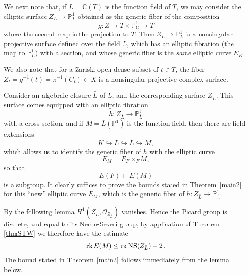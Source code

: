 \documentclass[11pt]{amsart}
\theoremstyle{definition}
\theoremstyle{definition}
\theoremstyle{remark}
\theoremstyle{remark}
\theoremstyle{definition}
\theoremstyle{conjecture}
\newcommand{\NS}{\mathrm{NS}}
\begin{document}
We next note that, if $L={\mathbb C}(T)$ is the function field of $T$,
we may consider the elliptic surface $Z_L\to {\mathbb P}^1_L$
obtained as the generic fiber of the composition
\[
g:Z\to T\times{\mathbb P}^1_{\mathbb C} \to T
\]
where the second map is the projection to $T$.
Then $Z_L\to {\mathbb P}^1_L$ is a nonsingular projective surface
defined over the field $L$, which has an elliptic fibration
(the map to ${\mathbb P}^1_L$) with a section,
and whose generic fiber is the {\em same} elliptic curve $E_K$.

We also note that for a Zariski open dense subset of $t\in T$,
the fiber $Z_t=g^{-1}(t)=\pi^{-1}(C_t)\subset X$ is a nonsingular projective complex surface.

Consider an algebraic closure $\bar{L}$ of $L$, and the corresponding surface $Z_{\bar{L}}$.  This surface comes equipped with an elliptic fibration
\[
h:Z_{\bar{L}}\to {\mathbb P}^1_{\bar{L}}
\]
with a cross section, and if $M=\bar{L}({\mathbb P}^1)$ is the function field,
then there are field extensions
\[
K\hookrightarrow L \hookrightarrow \bar{L}\hookrightarrow M,
\]
which allows us to identify the generic fiber of $h$ with the elliptic curve
\[
E_M=E_F\times_FM,
\]
so that
\[
E(F)\subset E(M)
\]
is a subgroup.
It clearly suffices to prove the bounds stated in Theorem~\ref{main2}
for this ``new'' elliptic curve $E_M$,
which is the generic fiber of $h:Z_{\bar{L}}\to {\mathbb P}^1_{\bar{L}}$.



By the following lemma $H^1(Z_{\bar{L}},{\mathcal O}_{Z_{\bar{L}}})$
vanishes. \color{black}%
Hence the Picard group is discrete, and equal to its Neron-Severi group;
by application of Theorem \ref{thmSTW} we therefore have the estimate
\[
{\rm rk}\,E(M)\leq {\rm rk}\,\NS(Z_{\bar{L}})-2 \,.
\]
 The bound stated in Theorem~\ref{main2} follows immediately from the lemma below.
\end{document}
